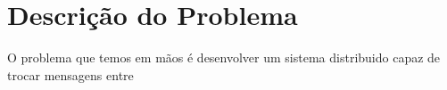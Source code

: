 \chapter{Descrição do Problema}
O problema que temos em mãos é desenvolver um sistema distribuido capaz de trocar mensagens entre 
